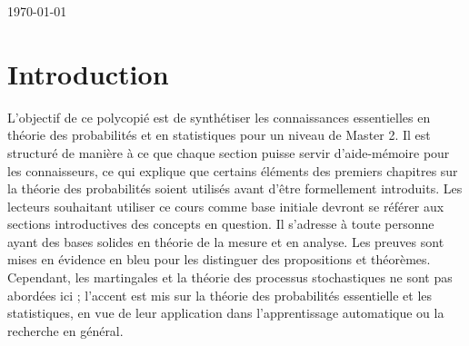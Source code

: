 \documentclass[12pt]{article}
\newcommand{\petitespace}{\vspace{0.5cm}}
\newcounter{proposition}[subsection] %
\newcommand{\1}{\bb{1}} %
\begin{document}
\begin{titlepage}


{\large \today}\\[2cm] %

\vfill %

\end{titlepage}


\tableofcontents
\newpage



\section{Introduction}

\petitespace

L'objectif de ce polycopié est de synthétiser les connaissances essentielles en théorie des probabilités et en statistiques pour un niveau de Master 2. Il est structuré de manière à ce que chaque section puisse servir d'aide-mémoire pour les connaisseurs, ce qui explique que certains éléments des premiers chapitres sur la théorie des probabilités soient utilisés avant d'être formellement introduits. Les lecteurs souhaitant utiliser ce cours comme base initiale devront se référer aux sections introductives des concepts en question. Il s'adresse à toute personne ayant des bases solides en théorie de la mesure et en analyse. Les preuves sont mises en évidence en bleu pour les distinguer des propositions et théorèmes. Cependant, les martingales et la théorie des processus stochastiques ne sont pas abordées ici ; l'accent est mis sur la théorie des probabilités essentielle et les statistiques, en vue de leur application dans l'apprentissage automatique ou la recherche en général.
\end{document}
